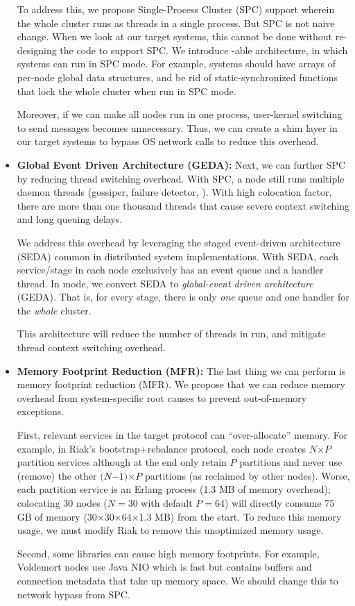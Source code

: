 \begin{itemize}
To address this, we propose Single-Process Cluster (SPC) support wherein the
whole cluster runs as threads in a single process. But SPC is not naive change.
When we look at our target systems, this cannot be done without re-designing the
code to support SPC. We introduce \sck-able architecture, in which systems can
run in SPC mode. For example, systems should have arrays of per-node global data
structures, and be rid of static-synchronized functions that lock the whole
cluster when run in SPC mode.

Moreover, if we can make all nodes run in one process, user-kernel switching to
send messages becomes unnecessary. Thus, we can create a shim layer in our
target systems to bypass OS network calls to reduce this overhead.


\item {\bf Global Event Driven Architecture (GEDA):} Next, we can further SPC by
reducing thread switching overhead. With SPC, a node still runs multiple daemon
threads (gossiper, failure detector, \etc). With high colocation factor, there
are more than one thousand threads that cause severe context switching and long
queuing delays.

We address this overhead by leveraging the staged event-driven architecture
(SEDA) \cite{Welsh+01-Seda} common in distributed system implementations.  With
SEDA, each service/stage in each node exclusively has an event queue and a
handler thread. In \sck mode, we convert SEDA to {\em global-event driven
architecture} (GEDA). That is, for every stage, there is only {\em one} queue
and one handler for the {\em whole} cluster.

This architecture will reduce the number of threads in \sck run, and mitigate
thread context switching overhead.

\item {\bf Memory Footprint Reduction (MFR):} The last thing we can perform is
memory footprint reduction (MFR). We propose that we can reduce memory overhead
from system-specific root causes to prevent out-of-memory exceptions.

First, relevant services in the target protocol can ``over-allocate'' memory.
%
For example, in Riak's bootstrap+rebalance protocol, each node creates
$N$$\times$$P$ partition services although at the end only retain $P$ partitions
and never use (remove) the other $(N$$-$$1)$$\times$$P$ partitions (as reclaimed
by other nodes).
%
Worse, each partition service is an Erlang process (1.3 MB of memory overhead);
colocating 30 nodes ($N$$=$30 with default $P$$=$64) will directly consume 75 GB
of memory (30$\times$30$\times$64$\times$1.3 MB) from the start.
%
To reduce this memory usage, we must modify Riak to remove this unoptimized
memory usage.

Second, some libraries can cause high memory footprints. For example, Voldemort
nodes use Java NIO \cite{VoldemortNIO} which is fast but contains buffers and
connection metadata that take up memory space. We should change this to
network bypass from SPC.



\end{itemize}

